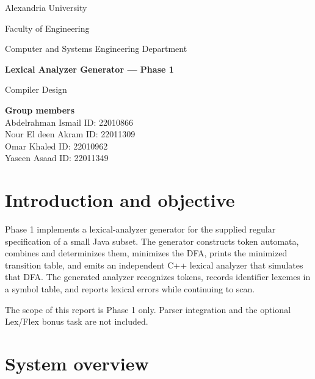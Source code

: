 \documentclass[11pt,a4paper]{article}
\begin{document}
\hypersetup{pageanchor=false}
\begin{titlepage}
    \centering
    \vspace*{18mm}
    {\Large Alexandria University\par}
    \vspace{3mm}
    {\large Faculty of Engineering\par}
    {\large Computer and Systems Engineering Department\par}
    \vspace{24mm}
    {\LARGE\bfseries Lexical Analyzer Generator --- Phase 1\par}
    \vspace{8mm}
    {\Large Compiler Design\par}
    \vspace{24mm}
    \begin{minipage}{0.82\textwidth}
        \centering
        \large
        \textbf{Group members}\\[8mm]
        Abdelrahman Ismail \quad ID: 22010866\\[7mm]
        Nour El deen Akram \quad ID: 22011309\\[7mm]
        Omar Khaled \quad ID: 22010962\\[7mm]
        Yaseen Asaad \quad ID: 22011349
    \end{minipage}
    \vfill
\end{titlepage}

\hypersetup{pageanchor=true}
\tableofcontents
\clearpage
{}

\section{Introduction and objective}

Phase 1 implements a lexical-analyzer generator for the supplied regular
specification of a small Java subset. The generator constructs token
automata, combines and determinizes them, minimizes the DFA, prints the
minimized transition table, and emits an independent C++ lexical analyzer
that simulates that DFA. The generated analyzer recognizes tokens,
records identifier lexemes in a symbol table, and reports lexical errors
while continuing to scan.

The scope of this report is Phase 1 only. Parser integration and the
optional Lex/Flex bonus task are not included.

\section{System overview}
\end{document}
